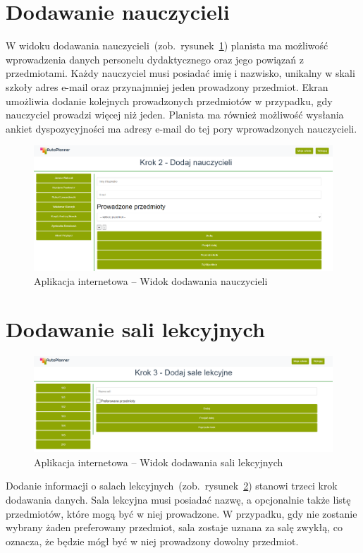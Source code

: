 \section{Dodawanie nauczycieli}
W widoku dodawania nauczycieli~(zob.~rysunek~\ref{rys:teacher}) planista ma możliwość wprowadzenia danych personelu dydaktycznego oraz jego powiązań z przedmiotami. Każdy nauczyciel musi posiadać imię i nazwisko, unikalny w skali szkoły adres e-mail oraz przynajmniej jeden prowadzony przedmiot. Ekran umożliwia dodanie kolejnych prowadzonych przedmiotów w przypadku, gdy nauczyciel prowadzi więcej niż jeden. Planista ma również możliwość wysłania ankiet dyspozycyjności ma adresy e-mail do tej pory wprowadzonych nauczycieli.
\begin{figure}[!ht]
\centering\includegraphics[width=\textwidth]{figures/teacher}
\caption{Aplikacja internetowa -- Widok dodawania nauczycieli}\label{rys:teacher}
\end{figure}
\section{Dodawanie sali lekcyjnych}
\begin{figure}[h]
\centering\includegraphics[width=\textwidth]{figures/classroom}
\caption{Aplikacja internetowa -- Widok dodawania sali lekcyjnych}\label{rys:classroom}
\end{figure}
Dodanie informacji o salach lekcyjnych~(zob.~rysunek~\ref{rys:classroom}) stanowi trzeci krok dodawania danych. Sala lekcyjna musi posiadać nazwę, a opcjonalnie także listę przedmiotów, które mogą być w  niej prowadzone. W przypadku, gdy nie zostanie wybrany żaden preferowany przedmiot, sala zostaje uznana za salę zwykłą, co oznacza, że będzie mógł być w niej prowadzony dowolny przedmiot.
